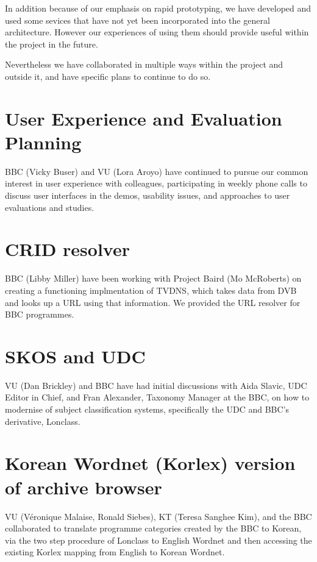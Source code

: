 \documentclass{notube}
\begin{document}
In addition because of our emphasis on rapid prototyping, we have developed and used some sevices that have not yet been incorporated into the general architecture. However our experiences of using them should provide useful within the project in the future.

Nevertheless we have collaborated in multiple ways within the project and outside it, and have specific plans to continue to do so.

\section{User Experience and Evaluation Planning}

BBC (Vicky Buser) and VU (Lora Aroyo) have continued to pursue our common interest in user experience with colleagues, participating in weekly phone calls to discuss user interfaces in the demos, usability issues, and approaches to user evaluations and studies. 

\section{CRID resolver}

BBC (Libby Miller) have been working with Project Baird (Mo McRoberts) on creating a functioning implmentation of TVDNS, which takes data from DVB and looks up a URL using that information. We provided the URL resolver for BBC programmes.

\section{SKOS and UDC}

VU (Dan Brickley) and BBC have had initial discussions with Aida Slavic, UDC Editor in Chief, and Fran Alexander, Taxonomy Manager at the BBC, on how to modernise of subject classification systems, specifically the UDC and BBC's derivative, Lonclass. 

\section{Korean Wordnet (Korlex) version of archive browser}

VU (Véronique Malaise, Ronald Siebes), KT (Teresa Sanghee Kim), and the BBC collaborated to translate programme categories created by the BBC to Korean, via the two step procedure of Lonclass to English Wordnet and then accessing the existing Korlex mapping from English to Korean Wordnet.
\end{document}

